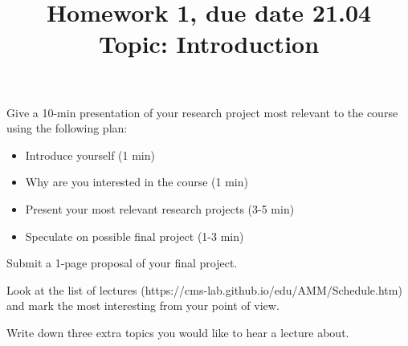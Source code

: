 \documentclass{homework}
\begin{document}
\title{Homework 1, due date 21.04 \\ Topic: Introduction}
\maketitle

\begin{task} Give a 10-min presentation of your research project most relevant to the course using the following plan:
\begin{itemize}\setlength{\itemsep}{0ex}
\item Introduce yourself (1 min)
\item Why are you interested in the course (1 min)
\item Present your most relevant research projects (3-5 min)
\item Speculate on possible final project (1-3 min)
\end{itemize}
\end{task}

\begin{task} Submit a 1-page proposal of your final project.
\end{task}

\begin{task}
Look at the list of lectures (https://cms-lab.github.io/edu/AMM/Schedule.htm) and mark the most interesting from your point of view. 
\end{task}

\begin{task}
Write down three extra topics you would like to hear a lecture about.
\end{task}
\end{document}
